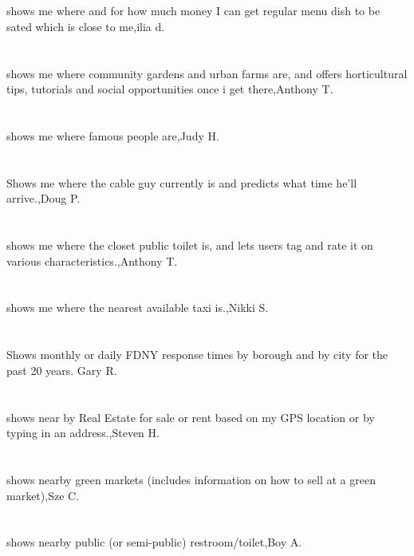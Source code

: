\section{}shows me where and for how much money I can get regular menu dish to be sated which is close to me,ilia d.
\section{}shows me where community gardens and urban farms are, and offers horticultural tips, tutorials and social opportunities once i get there,Anthony T.
\section{}shows me where famous people are,Judy H.	
\section{}Shows me where the cable guy currently is and predicts what time he'll arrive.,Doug P.	
\section{}shows me where the closet public toilet is, and lets users tag and rate it on various characteristics.,Anthony T.	
\section{} shows me where the nearest available taxi is.,Nikki S.	
\section{}Shows monthly or daily FDNY response times by borough and by city for the past 20 years. Gary R.	
\section{} shows near by Real Estate for sale or rent based on my GPS location or by typing in an address.,Steven H.	
\section{}shows nearby green markets (includes information on how to sell at a green market),Sze C.	
\section{}shows nearby public (or semi-public) restroom/toilet,Boy A.	

